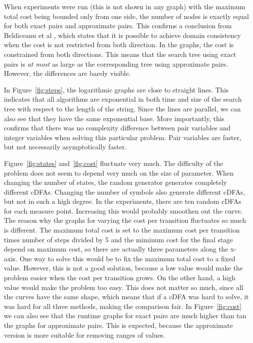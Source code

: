 \documentclass[a4paper,11pt]{article}
\begin{document}
When experiments were run (this is not shown in any graph) with the maximum total cost being bounded only from one side, the number of nodes is exactly equal for both exact pairs and approximate pairs. This confirms a conclusion from Beldiceanu et al \cite{Beldiceanu675954}, which states that it is possible to achieve domain consistency when the cost is not restricted from both direction. In the graphs, the cost is constrained from both directions. This means that the search tree using exact pairs is \textit{at most} as large as the corresponding tree using approximate pairs. However, the differences are barely visible.

In Figure~\ref{fig:steps}, the logarithmic graphs are close to straight lines. This indicates that all algorithms are exponential in both time and size of the search tree with respect to the length of the string. Since the lines are parallel, we can also see that they have the same exponential base. More importantly, this confirms that there was no complexity difference between pair variables and integer variables when solving this particular problem. Pair variables are faster, but not necessarily asymptotically faster. 

Figure~\ref{fig:states} and~\ref{fig:cost} fluctuate very much. The difficulty of the problem does not seem to depend very much on the size of parameter. When changing the number of states, the random generator generates completely different cDFAs. Changing the number of symbols also generate different cDFAs, but not in such a high degree. In the experiments, there are ten random cDFAs for each measure point. Increasing this would probably smoothen out the curve. The reason why the graphs for varying the cost per transition fluctuates so much is different. The maximum total cost is set to the maximum cost per transition times number of steps divided by 5 and the miminum cost for the final stage depend on maximum cost, so there are actually three parameters along the x-axis. One way to solve this would be to fix the maximum total cost to a fixed value. However, this is not a good solution, because a low value would make the problem easier when the cost per transition grows. On the other hand, a high value would make the problem too easy. This does not matter so much, since all the curves have the same shape, which means that if a cDFA was hard to solve, it was hard for all three methods, making the comparison fair. In Figure~\ref{fig:cost} we can also see that the runtime graphs for exact pairs are much higher than tan the graphs for approximate pairs. This is expected, because the approximate version is more suitable for removing ranges of values.
\end{document}
